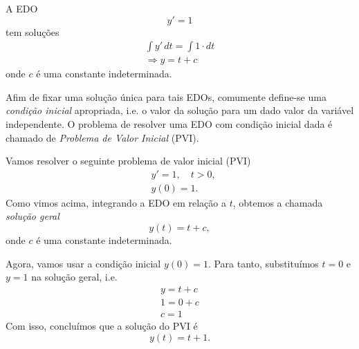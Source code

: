

\begin{ex}
  A EDO
  \begin{equation}
    y' = 1
  \end{equation}
  tem soluções
  \begin{gather}
    \int y'\,dt = \int 1\cdot dt\\
    \Rightarrow y = t + c
  \end{gather}
  onde $c$ é uma constante indeterminada.
\end{ex}

Afim de fixar uma solução única para tais EDOs, comumente define-se uma \emph{condição inicial} apropriada, i.e. o valor da solução para um dado valor da variável independente. O problema de resolver uma EDO com condição inicial dada é chamado de \emph{Problema de Valor Inicial} (PVI).

\begin{ex}
  Vamos resolver o seguinte problema de valor inicial (PVI)
  \begin{align}
    &y' = 1,\quad t>0,\\
    &y(0)=1.
  \end{align}
  Como vimos acima, integrando a EDO em relação a $t$, obtemos a chamada \emph{solução geral}
  \begin{equation}
    y(t) = t + c,
  \end{equation}
  onde $c$ é uma constante indeterminada.

  Agora, vamos usar a condição inicial $y(0)=1$. Para tanto, substituímos $t=0$ e $y=1$ na solução geral, i.e.
  \begin{gather}
    y = t + c\\
    1 = 0 + c\\
    c = 1
  \end{gather}
  Com isso, concluímos que a solução do PVI é
  \begin{equation}
    y(t) = t + 1.
  \end{equation}
\end{ex}


